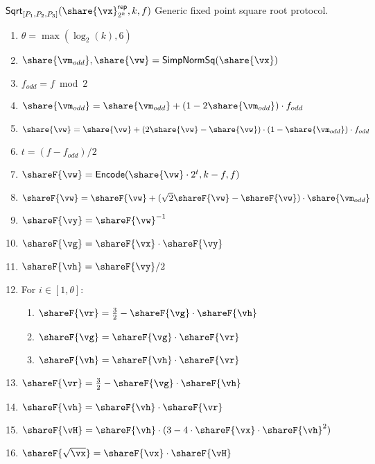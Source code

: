 \msubsubsection
  {$\mathsf{Sqrt}_{[P_1, P_2, P_3]}(\share{\vx}^\mathsf{rep}_{2^k}, k, f)$}
  \label{fig:sqrt-generic}
  Generic fixed point square root protocol.

  \begin{enumerate}
    \item $\theta = \max(\log_2(k), 6)$
    \item $\share{\vm_{odd}}, \share{\vw} = \mathsf{SimpNormSq}(\share{\vx})$
    \item $f_{odd} = f \bmod 2$
    \item $\share{\vm_{odd}} = \share{\vm_{odd}} + (1 - 2 \share{\vm_{odd}}) \cdot f_{odd}$
    \item $\share{\vw} = \share{\vw} + (2 \share{\vw} - \share{\vw}) \cdot (1 - \share{\vm_{odd}}) \cdot f_{odd}$
    \item $t = (f - f_{odd}) / 2$
    \item $\shareF{\vw} = \mathsf{Encode}(\share{\vw} \cdot 2^t, k-f, f)$
    \item $\shareF{\vw} = \shareF{\vw} + (\sqrt{2} \shareF{\vw} - \shareF{\vw}) \cdot \share{\vm_{odd}}$
    \item $\shareF{\vy} = \shareF{\vw}^{-1}$
    \item $\shareF{\vg} = \shareF{\vx} \cdot \shareF{\vy}$
    \item $\shareF{\vh} = \shareF{\vy} / 2$
    \item For $i \in [1, \theta]$:
    \begin{enumerate}
      \item $\shareF{\vr} = \frac{3}{2} - \shareF{\vg} \cdot \shareF{\vh}$
      \item $\shareF{\vg} = \shareF{\vg} \cdot \shareF{\vr}$
      \item $\shareF{\vh} = \shareF{\vh} \cdot \shareF{\vr}$
    \end{enumerate}
    \item $\shareF{\vr} = \frac{3}{2} - \shareF{\vg} \cdot \shareF{\vh}$
    \item $\shareF{\vh} = \shareF{\vh} \cdot \shareF{\vr}$
    \item $\shareF{\vH} = \shareF{\vh} \cdot (3 - 4 \cdot \shareF{\vx} \cdot \shareF{\vh}^2)$
    \item $\shareF{\sqrt{\vx}} = \shareF{\vx} \cdot \shareF{\vH}$
  \end{enumerate}


